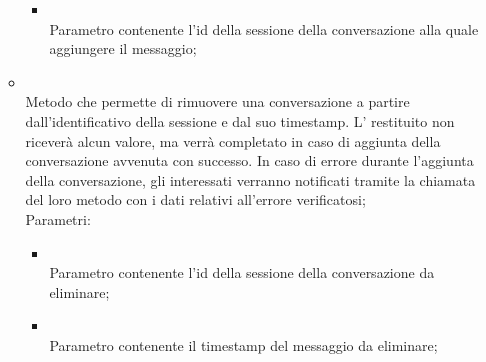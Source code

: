 \begin{itemize}
\begin{itemize}
\begin{itemize}
			\item {} \\
			Parametro contenente l'id della sessione della conversazione alla quale aggiungere il messaggio;
		\end{itemize}
		\item[]  \\
		Metodo che permette di rimuovere una conversazione a partire dall'identificativo della sessione e dal suo timestamp.  L' restituito non riceverà alcun valore, ma verrà completato in caso di aggiunta della conversazione avvenuta con successo. In caso di errore durante l'aggiunta della conversazione, gli  interessati verranno notificati tramite la chiamata del loro metodo  con i dati relativi all'errore verificatosi;\\
		Parametri:
		\begin{itemize}
			\item {} \\
			Parametro contenente l'id della sessione della conversazione da eliminare;
			\item {} \\
			Parametro contenente il timestamp del messaggio da eliminare;
		\end{itemize}
	\end{itemize}
\end{itemize}

